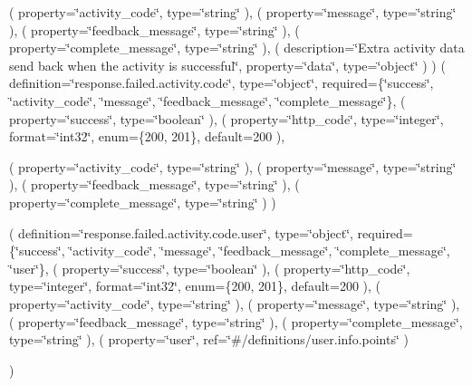 ( property=\char`\"{}activity\+\_\+code\char`\"{}, type=\char`\"{}string\char`\"{} ), ( property=\char`\"{}message\char`\"{}, type=\char`\"{}string\char`\"{} ), ( property=\char`\"{}feedback\+\_\+message\char`\"{}, type=\char`\"{}string\char`\"{} ), ( property=\char`\"{}complete\+\_\+message\char`\"{}, type=\char`\"{}string\char`\"{} ), ( description=\char`\"{}\+Extra activity data send back when the activity is successful\char`\"{}, property=\char`\"{}data\char`\"{}, type=\char`\"{}object\char`\"{} ) ) ( definition=\char`\"{}response.\+failed.\+activity.\+code\char`\"{}, type=\char`\"{}object\char`\"{}, required=\{\char`\"{}success\char`\"{}, \char`\"{}activity\+\_\+code\char`\"{}, \char`\"{}message\char`\"{}, \char`\"{}feedback\+\_\+message\char`\"{}, \char`\"{}complete\+\_\+message\char`\"{}\}, ( property=\char`\"{}success\char`\"{}, type=\char`\"{}boolean\char`\"{} ), ( property=\char`\"{}http\+\_\+code\char`\"{}, type=\char`\"{}integer\char`\"{}, format=\char`\"{}int32\char`\"{}, enum=\{200, 201\}, default=200 ),

( property=\char`\"{}activity\+\_\+code\char`\"{}, type=\char`\"{}string\char`\"{} ), ( property=\char`\"{}message\char`\"{}, type=\char`\"{}string\char`\"{} ), ( property=\char`\"{}feedback\+\_\+message\char`\"{}, type=\char`\"{}string\char`\"{} ), ( property=\char`\"{}complete\+\_\+message\char`\"{}, type=\char`\"{}string\char`\"{} ) )

( definition=\char`\"{}response.\+failed.\+activity.\+code.\+user\char`\"{}, type=\char`\"{}object\char`\"{}, required=\{\char`\"{}success\char`\"{}, \char`\"{}activity\+\_\+code\char`\"{}, \char`\"{}message\char`\"{}, \char`\"{}feedback\+\_\+message\char`\"{}, \char`\"{}complete\+\_\+message\char`\"{}, \char`\"{}user\char`\"{}\}, ( property=\char`\"{}success\char`\"{}, type=\char`\"{}boolean\char`\"{} ), ( property=\char`\"{}http\+\_\+code\char`\"{}, type=\char`\"{}integer\char`\"{}, format=\char`\"{}int32\char`\"{}, enum=\{200, 201\}, default=200 ), ( property=\char`\"{}activity\+\_\+code\char`\"{}, type=\char`\"{}string\char`\"{} ), ( property=\char`\"{}message\char`\"{}, type=\char`\"{}string\char`\"{} ), ( property=\char`\"{}feedback\+\_\+message\char`\"{}, type=\char`\"{}string\char`\"{} ), ( property=\char`\"{}complete\+\_\+message\char`\"{}, type=\char`\"{}string\char`\"{} ), ( property=\char`\"{}user\char`\"{}, ref=\char`\"{}\#/definitions/user.\+info.\+points\char`\"{} )

)


